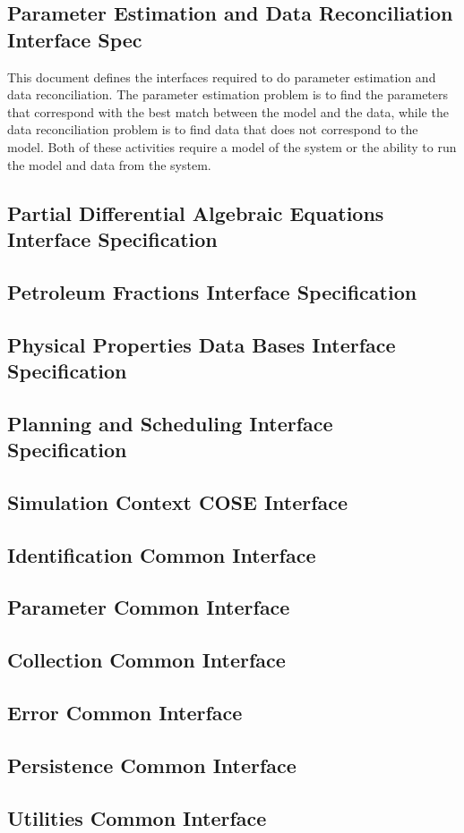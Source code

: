 \subsection{Parameter Estimation and Data Reconciliation Interface Spec}
This document defines the interfaces required to do parameter estimation and data reconciliation.  The parameter estimation problem is to find the parameters that correspond with the best match between the model and the data, while the data reconciliation problem is to find data that does not correspond to the model.  Both of these activities require a model of the system or the ability to run the model and data from the system.  

\subsection{Partial Differential Algebraic Equations Interface Specification}

\subsection{Petroleum Fractions Interface Specification}

\subsection{Physical Properties Data Bases Interface Specification}

\subsection{Planning and Scheduling Interface Specification}

\subsection{Simulation Context COSE Interface}


\subsection{Identification Common Interface}
\subsection{Parameter Common Interface}
\subsection{Collection Common Interface}
\subsection{Error Common Interface}
\subsection{Persistence Common Interface}
\subsection{Utilities Common Interface}


